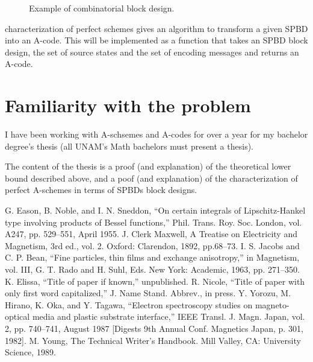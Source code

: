 \documentclass[conference]{IEEEtran}
\begin{document}
\begin{figure}[htbp]
    \centerline{
    }
    \caption{Example of combinatorial block design.}
    \label{block_design}
\end{figure}

\cite{b4} characterization of perfect schemes gives an algorithm to transform a given SPBD into an A-code. This will be implemented as a function that takes an SPBD block design, the set of source states and the set of encoding messages and returns an A-code.

\newpage
%
%
\section{Familiarity with the problem}
I have been working with A-schsemes and A-codes for over a year for my bachelor degree's thesis (all UNAM's Math bachelors must present a thesis).

The content of the thesis is a proof (and explanation) of the theoretical lower bound described above, and a poof (and explanation) of the characterization of perfect A-schemes in terms of SPBDs block designs.

%
%
\begin{thebibliography}{00}
     G. Eason, B. Noble, and I. N. Sneddon, ``On certain integrals of Lipschitz-Hankel type involving products of Bessel functions,'' Phil. Trans. Roy. Soc. London, vol. A247, pp. 529--551, April 1955.
     J. Clerk Maxwell, A Treatise on Electricity and Magnetism, 3rd ed., vol. 2. Oxford: Clarendon, 1892, pp.68--73.
     I. S. Jacobs and C. P. Bean, ``Fine particles, thin films and exchange anisotropy,'' in Magnetism, vol. III, G. T. Rado and H. Suhl, Eds. New York: Academic, 1963, pp. 271--350.
     K. Elissa, ``Title of paper if known,'' unpublished.
     R. Nicole, ``Title of paper with only first word capitalized,'' J. Name Stand. Abbrev., in press.
     Y. Yorozu, M. Hirano, K. Oka, and Y. Tagawa, ``Electron spectroscopy studies on magneto-optical media and plastic substrate interface,'' IEEE Transl. J. Magn. Japan, vol. 2, pp. 740--741, August 1987 [Digests 9th Annual Conf. Magnetics Japan, p. 301, 1982].
     M. Young, The Technical Writer's Handbook. Mill Valley, CA: University Science, 1989.
\end{thebibliography}
\end{document}

